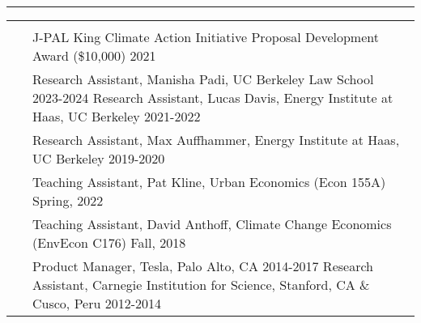 \documentclass[letterpaper,10pt,oneside]{article}
\newenvironment{myresume}[2]{\pdfbookmark{#1}{#1}{\LARGE{\textbf{#1}}}\vspace{1mm}\hrule\vspace{-2mm}\begin{longtable}{p{0.12\textwidth} p{0.8\textwidth}}&#2}{\end{longtable}}
\renewcommand{\section}[2]{\vspace{-1.5em}\\\pdfbookmark{#1}{#2}{\singlespace\textsc{#1}}&}
\newcommand{\firstentry}[1]{\vspace{0em}\newline#1\vspace{0em}}
\newcommand{\entry}[1]{\vspace{-1em}\\~&#1}
\begin{document}
\begin{myresume}{}
\entry{J-PAL King Climate Action Initiative Proposal Development Award (\$10,000) \hfill 2021
}


\section{Research \newline Positions}{positions}

\firstentry{Research Assistant, Manisha Padi, UC Berkeley Law School \hfill 2023-2024
\newline Research Assistant, Lucas Davis, Energy Institute at Haas, UC Berkeley \hfill 2021-2022
}



\entry{Research Assistant, Max Auffhammer, Energy Institute at Haas, UC Berkeley \hfill 2019-2020
}



\section{Teaching}{teaching}

\firstentry{Teaching Assistant, Pat Kline, Urban Economics (Econ 155A) \hfill Spring, 2022
}

\entry{Teaching Assistant, David Anthoff, Climate Change Economics (EnvEcon C176) \hfill Fall, 2018
}


\section{Prior \newline Employment}{prior}

\firstentry{Product Manager, Tesla, Palo Alto, CA \hfill 2014-2017
\newline Research Assistant, Carnegie Institution for Science, Stanford, CA \& Cusco, Peru \hfill 2012-2014
}



\end{myresume}
\end{document}

